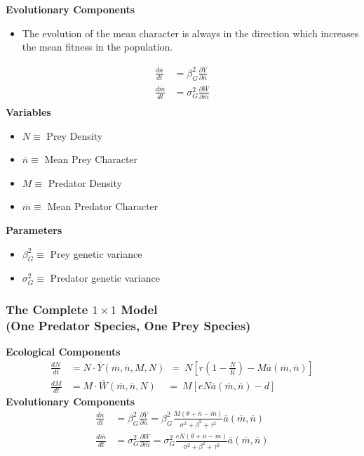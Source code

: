 \documentclass[10pt]{beamer}
\begin{document}
\begin{frame}
	\frametitle{}
	{\bf Evolutionary Components}
	\begin{itemize}
		\item The evolution of the mean character is always in the direction which increases the mean fitness in the population.
	\end{itemize}
	\begin{align*}
	\frac{d\overline{n}}{dt} &= \beta_G^2\frac{\partial \overline{Y}}{\partial \overline{n}}\\[.1cm]
	\frac{d\overline{m}}{dt} &= \sigma_G^2\frac{\partial \overline{W}}{\partial \overline{m}}\\
	\end{align*}
	{\bf Variables}
	\begin{itemize}
		\item $N \equiv $ Prey Density
		\item $\overline{n} \equiv $ Mean Prey Character
		\item $M \equiv $ Predator Density
		\item $\overline{m} \equiv $ Mean Predator Character
	\end{itemize}
	{\bf Parameters}
	\begin{itemize}
		\item $\beta_G^2 \equiv $ Prey genetic variance
		\item $\sigma_G^2 \equiv $ Predator genetic variance
	\end{itemize}
\end{frame}
\begin{frame}
	\frametitle{The Complete $1\times1$ Model \\ (One Predator Species, One Prey Species)}
	{\bf Ecological Components}
	\begin{align*}
	\frac{dN}{dt} &= N\cdot \overline{Y}(\overline{m}, \overline{n}, M, N)\ \ =\ N\left[r\left(1 - \frac{N}{K}\right) - M\overline{a}(\overline{m}, \overline{n})\right]\\[.1cm]
	\frac{dM}{dt} &= M\cdot \overline{W}(\overline{m}, \overline{n}, N)\ \ \ \ \ =\ M\left[eN\overline{a}(\overline{m}, \overline{n}) - d\right]
	\end{align*}
	{\bf Evolutionary Components}
	\begin{align*}
	\frac{d\overline{n}}{dt} &= \beta_G^2\frac{\partial \overline{Y}}{\partial \overline{n}} = \beta_G^2\frac{M(\theta + \overline{n} - \overline{m})}{\sigma^2 + \beta^2 + \tau^2} \overline{a}(\overline{m}, \overline{n})\\[.1cm]
	\frac{d\overline{m}}{dt} &= \sigma_G^2\frac{\partial \overline{W}}{\partial \overline{m}} = \sigma_G^2\frac{eN(\theta + \overline{n} - \overline{m})}{\sigma^2 + \beta^2 + \tau^2} \overline{a}(\overline{m}, \overline{n})
	\end{align*}
\end{frame}
\end{document}
